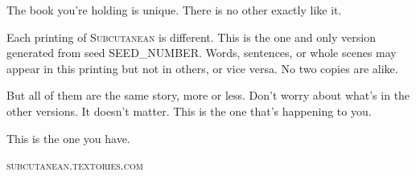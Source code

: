 \thispagestyle{empty}

\vspace*{10\nbs}

\begin{adjustwidth}{4em}{4em}
\begin{parascale}[0.88]
The book you're holding is unique. There is no other exactly like it.

Each printing of \textsc{Subcutanean} is different. This is the one and only version generated from seed SEED_NUMBER. Words, sentences, or whole scenes may appear in this printing but not in others, or vice versa. No two copies are alike.

But all of them are the same story, more or less. Don't worry about what's in the other versions. It doesn't matter. This is the one that's happening to you.

This is the one you have.  




\end{parascale}
\end{adjustwidth}

\vspace*{2\nbs}

\begin{center}
\textsc{subcutanean.textories.com}
\end{center}

\clearpage


